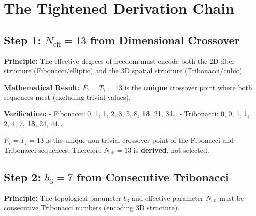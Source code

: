 \documentclass[
  11pt,
  letterpaper,
  twoside,
  openany]{book}
\makeatletter
\let\orig@section\section
\renewcommand{\section}{\needspace{8\baselineskip}\orig@section}
\let\orig@subsection\subsection
\renewcommand{\subsection}{\needspace{6\baselineskip}\orig@subsection}
\makeatother
\begin{document}
\section{The Tightened Derivation
Chain}\label{the-tightened-derivation-chain}

\subsection{\texorpdfstring{Step 1: \(N_{\text{eff}} = 13\) from
Dimensional
Crossover}{Step 1: N\_\{\textbackslash text\{eff\}\} = 13 from Dimensional Crossover}}\label{step-1-n_texteff-13-from-dimensional-crossover}

\textbf{Principle:} The effective degrees of freedom must encode both
the 2D fiber structure (Fibonacci/elliptic) and the 3D spatial structure
(Tribonacci/cubic).

\textbf{Mathematical Result:} \(F_7 = T_7 = 13\) is the \textbf{unique}
crossover point where both sequences meet (excluding trivial values).

\textbf{Verification:} - Fibonacci: 0, 1, 1, 2, 3, 5, 8, \textbf{13},
21, 34\ldots{} - Tribonacci: 0, 0, 1, 1, 2, 4, 7, \textbf{13}, 24,
44\ldots{}

\begin{tcolorbox}[enhanced jigsaw, colbacktitle=quarto-callout-note-color!10!white, titlerule=0mm, bottomtitle=1mm, bottomrule=.15mm, colback=white, arc=.35mm, breakable, toprule=.15mm, title=\textcolor{quarto-callout-note-color}{\faInfo}\hspace{0.5em}{Theorem NTHR-4}, rightrule=.15mm, coltitle=black, leftrule=.75mm, colframe=quarto-callout-note-color-frame, toptitle=1mm, opacityback=0, opacitybacktitle=0.6, left=2mm]

\(F_7 = T_7 = 13\) is the unique non-trivial crossover point of the
Fibonacci and Tribonacci sequences. Therefore \(N_{\text{eff}} = 13\) is
\textbf{derived}, not selected.

\end{tcolorbox}

\subsection{\texorpdfstring{Step 2: \(b_3 = 7\) from Consecutive
Tribonacci}{Step 2: b\_3 = 7 from Consecutive Tribonacci}}\label{step-2-b_3-7-from-consecutive-tribonacci}

\textbf{Principle:} The topological parameter \(b_3\) and effective
parameter \(N_{\text{eff}}\) must be consecutive Tribonacci numbers
(encoding 3D structure).
\end{document}

